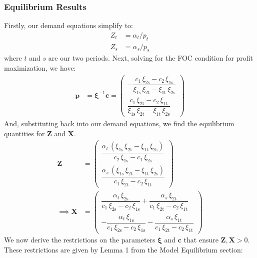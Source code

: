 \documentclass[11pt,a4paper,leqno]{extarticle}
\begin{document}
	\subsubsection{Equilibrium Results}
	
	Firstly, our demand equations simplify to:
	\begin{align}
	Z_t &= \alpha_t / p_t \\
	Z_s &= \alpha_s / p_s
	\end{align}
	where $t$ and $s$ are our two periods. Next, solving for the FOC condition for profit maximization, we have:
	\begin{align}
	\mathbf{p} &=  \boldsymbol{\xi}^{-1} \mathbf{c} = \begin{pmatrix}
	-\dfrac{c_{1}\,\xi _{\mathrm{2s}}-c_{2}\,\xi _{\mathrm{1s}}}{\xi _{\mathrm{1s}}\,\xi _{\mathrm{2t}}-\xi _{\mathrm{1t}}\,\xi _{\mathrm{2s}}}  \\[2ex]
	\dfrac{c_{1}\,\xi _{\mathrm{2t}}-c_{2}\,\xi _{\mathrm{1t}}}{\xi _{\mathrm{1s}}\,\xi _{\mathrm{2t}}-\xi _{\mathrm{1t}}\,\xi _{\mathrm{2s}}} 
	\end{pmatrix} 
	\end{align}
	And, substituting back into our demand equations, we find the equilibrium quantities for $\mathbf{Z}$ and $\mathbf{X}$. 
	\begin{align}
	\mathbf{Z} &= \begin{pmatrix}
	\dfrac{\alpha _{t}\,\left(\xi _{\mathrm{1s}}\,\xi _{\mathrm{2t}}-\xi _{\mathrm{1t}}\,\xi _{\mathrm{2s}}\right)}{c_{2}\,\xi _{\mathrm{1s}} - c_{1}\,\xi _{\mathrm{2s}}} \\[2ex]
	\dfrac{\alpha _{s}\,\left(\xi _{\mathrm{1s}}\,\xi _{\mathrm{2t}}-\xi _{\mathrm{1t}}\,\xi _{\mathrm{2s}}\right)}{c_{1}\,\xi _{\mathrm{2t}}-c_{2}\,\xi _{\mathrm{1t}}} 
	\end{pmatrix}\\
	\implies 
	\mathbf{X} &= \begin{pmatrix}
	\dfrac{\alpha _{t}\,\xi _{\mathrm{2s}}}{c_{1}\,\xi _{\mathrm{2s}}-c_{2}\,\xi _{\mathrm{1s}}}+\dfrac{\alpha _{s}\,\xi _{\mathrm{2t}}}{c_{1}\,\xi _{\mathrm{2t}}-c_{2}\,\xi _{\mathrm{1t}}} \\[2ex] 
	-\dfrac{\alpha _{t}\,\xi _{\mathrm{1s}}}{c_{1}\,\xi _{\mathrm{2s}}-c_{2}\,\xi _{\mathrm{1s}}}-\dfrac{\alpha _{s}\,\xi _{\mathrm{1t}}}{c_{1}\,\xi _{\mathrm{2t}}-c_{2}\,\xi _{\mathrm{1t}}}
	\end{pmatrix}
	\end{align}
	We now derive the restrictions on the parameters $\boldsymbol{\xi}$ and $\mathbf{c}$ that ensure $\mathbf{Z}, \mathbf{X} > 0$. These restrictions are given by Lemma 1 from the Model Equilibrium section:
	
\end{document}
